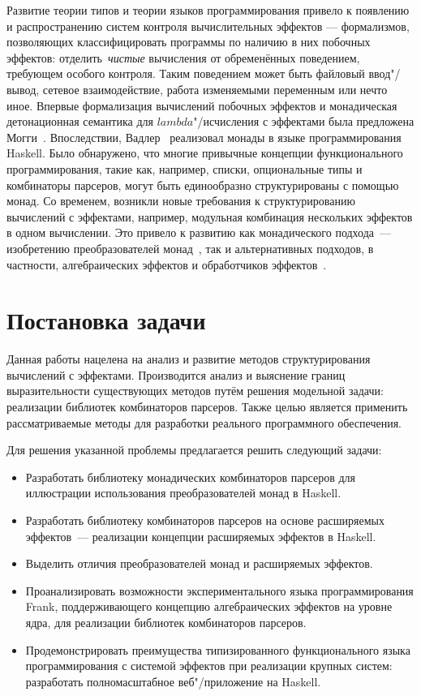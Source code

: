 \documentclass [fontsize=14pt, paper=a4, pagesize, DIV=calc]%
{article}
\begin{document}
Развитие теории типов и теории языков программирования привело к появлению и
распространению систем контроля вычислительных эффектов --- формализмов, позволяющих
классифицировать программы по наличию в них побочных эффектов: отделить~\emph{чистые}
вычисления от обременённых поведением, требующем особого контроля. Таким поведением
может быть файловый ввод"/вывод, сетевое взаимодействие, работа изменяемыми переменным
или нечто иное. Впервые формализация вычислений побочных эффектов и монадическая
детонационная семантика для $lambda$"/исчисления с эффектами была предложена
Могги~\cite{Moggi:1991:NCM:116981.116984}. Впоследствии,
Вадлер~\cite{Wadler:1992:EFP:143165.143169} реализовал монады в языке программирования
Haskell. Было обнаружено, что многие привычные концепции функционального программирования,
такие как, например, списки, опциональные типы и комбинаторы парсеров, могут быть
единообразно структурированы с помощью монад. Со временем, возникли новые требования
к структурированию вычислений с эффектами, например, модульная комбинация нескольких
эффектов в одном вычислении. Это привело к развитию как монадического подхода~---
изобретению преобразователей монад~\cite{Liang:1995:MTM:199448.199528}, так и
альтернативных подходов, в частности, алгебраических эффектов и обработчиков
эффектов~\cite{DBLP:journals/jlp/BauerP15}.

\section{Постановка задачи}

Данная работы нацелена на анализ и развитие методов структурирования вычислений
с эффектами. Производится анализ и выяснение границ выразительности существующих
методов путём решения модельной задачи: реализации библиотек комбинаторов парсеров.
Также целью является применить рассматриваемые методы для разработки реального
программного обеспечения.

Для решения указанной проблемы предлагается решить следующий задачи:

\begin{itemize}
\item Разработать библиотеку монадических комбинаторов парсеров для
иллюстрации использования преобразователей монад в Haskell.
\item Разработать библиотеку комбинаторов парсеров на основе расширяемых эффектов~---
реализации концепции расширяемых эффектов в Haskell.
\item Выделить отличия преобразователей монад и расширяемых эффектов.
\item Проанализировать возможности экспериментального языка программирования Frank,
поддерживающего концепцию алгебраических эффектов на уровне ядра, для реализации
библиотек комбинаторов парсеров.
\item Продемонстрировать преимущества типизированного функционального языка программирования
с системой эффектов при реализации крупных систем: разработать полномасштабное
веб"/приложение на Haskell.
\end{itemize}
\end{document}
